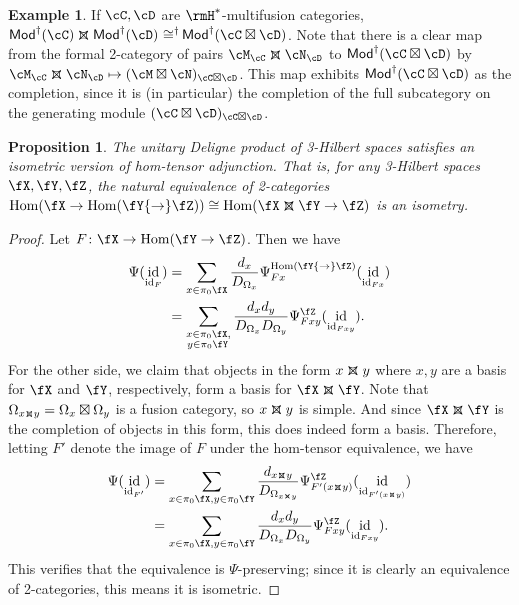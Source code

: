 \documentclass[12pt, reqno]{amsart}
\DeclareMathOperator{\Hom}{Hom}
\DeclareMathOperator{\id}{id}
\newcommand{\Mod}{\mathsf{Mod}}
\theoremstyle{plain}
\newtheorem{prop}[thm]{Proposition}
\theoremstyle{definition}
\newtheorem{ex}[thm]{Example}
\DeclareMathOperator{\isomeq}{\mathbin{\,\cong^\dag}}
\newcommand{\dtimesaux}[4]{\mathbin{\vcenter{\hbox{\raisebox{#4}{\scalebox{#3}{\ooalign{\hfil$\vcenter{\hbox{$#1\times$}}$\hfil\cr\hfil$\vcenter{\hbox{\mbox{#2\upshape\wasylozenge}}}$\hfil\cr}}}}}}}
\newcommand{\dtimes}{%
  \mathchoice
    {\dtimesaux{\displaystyle}{\normalsize}{1.15}{0.35ex}}
    {\dtimesaux{\textstyle}{\normalsize}{1.15}{0.35ex}}
    {\dtimesaux{\scriptstyle}{\scriptsize}{1.0}{0ex}}
    {\dtimesaux{\scriptscriptstyle}{\tiny}{1.0}{0ex}}%
}
\newcommand{\threehilbtimes}{\dtimes}
\begin{document}
    \begin{ex}
    \label{ex:3HilbSymmetricMonoidal}
    If $\cC,\cD$ are $\rmH^*$-multifusion categories, 
    $\Mod^\dag(\cC) \threehilbtimes \Mod^\dag(\cD) \isomeq \Mod^\dag(\cC\boxtimes\cD)$.
    Note that there is a clear map from the formal 2-category of pairs $\cM_\cC\threehilbtimes\cN_\cD$ to $\Mod^\dag(\cC\boxtimes\cD)$ by $\cM_\cC\threehilbtimes\cN_\cD \mapsto (\cM\boxtimes\cN)_{\cC\boxtimes \cD}$.
    This map exhibits $\Mod^\dag(\cC\boxtimes\cD)$ as the completion, since it is (in particular) the completion of the full subcategory on the generating module $(\cC\boxtimes\cD)_{\cC\boxtimes\cD}$.
    \end{ex}

    \begin{prop}
    The unitary Deligne product of 3-Hilbert spaces satisfies an isometric version of hom-tensor adjunction.
    That is, for any 3-Hilbert spaces $\fX,\fY,\fZ$, the natural equivalence of 2-categories $\Hom(\fX\to\Hom(\fY{\to}\fZ)) \cong \Hom(\fX\threehilbtimes\fY\to\fZ)$ is an isometry.
    \end{prop}
    \begin{proof}
    Let $F\colon\fX \to \Hom(\fY\to\fZ)$.
    Then we have
    \begin{align*}
    \Psi(\id_{\id_F}) &= \sum_{x \in \pi_0\fX} \frac{d_x}{D_{\Omega_x}}\Psi^{\Hom(\fY{\to}\fZ)}_{Fx}(\id_{\id_{Fx}}) \\
    &= \sum_{\substack{x\in\pi_0\fX, \\ \!y\in\pi_0\fY}} \frac{d_xd_y}{D_{\Omega_x}D_{\Omega_y}}\Psi^{\fZ}_{Fxy}(\id_{\id_{Fxy}}).
    \end{align*}
    For the other side, we claim that objects in the form $x\threehilbtimes y$ where $x,y$ are a basis for $\fX$ and $\fY$, respectively, form a basis for $\fX\threehilbtimes \fY$.
    Note that $\Omega_{x\threehilbtimes y} = \Omega_x\boxtimes \Omega_y$ is a fusion category, so $x\threehilbtimes y$ is simple.
    And since $\fX \threehilbtimes \fY$ is the completion of objects in this form, this does indeed form a basis.
    Therefore, letting $F'$ denote the image of $F$ under the hom-tensor equivalence, we have
    \begin{align*}
    \Psi(\id_{\id_{F'}}) &= \sum_{x \in \pi_0\fX,y \in \pi_0\fY} \frac{d_{x\threehilbtimes y}}{D_{\Omega_{x\threehilbtimes y}}} \Psi^{\fZ}_{F'(x\threehilbtimes y)}(\id_{\id_{F'(x\threehilbtimes y)}}) \\
    &= \sum_{x \in \pi_0\fX,y\in\pi_0\fY} \frac{d_xd_y}{D_{\Omega_x}D_{\Omega_y}}\Psi^{\fZ}_{Fxy}(\id_{\id_{Fxy}}).
    \end{align*}
This verifies that the equivalence is $\Psi$-preserving; since it is clearly an equivalence of 2-categories, this means it is isometric.
    \end{proof}
\end{document}
